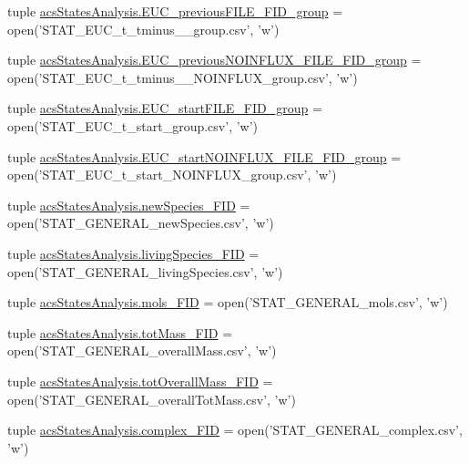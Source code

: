 \begin{DoxyCompactItemize}
tuple \hyperlink{a00132_adf079c2d443f89f00a330a58f99c2095}{acs\+States\+Analysis.\+E\+U\+C\+\_\+previous\+F\+I\+L\+E\+\_\+\+F\+I\+D\+\_\+group} = open('S\+T\+A\+T\+\_\+\+E\+U\+C\+\_\+t\+\_\+tminus\+\_\+\_\+group.\+csv', 'w')
\item 
tuple \hyperlink{a00132_ace5cf628b305f9110e058d7dafd27fb4}{acs\+States\+Analysis.\+E\+U\+C\+\_\+previous\+N\+O\+I\+N\+F\+L\+U\+X\+\_\+\+F\+I\+L\+E\+\_\+\+F\+I\+D\+\_\+group} = open('S\+T\+A\+T\+\_\+\+E\+U\+C\+\_\+t\+\_\+tminus\+\_\+\_\+\+N\+O\+I\+N\+F\+L\+U\+X\+\_\+group.\+csv', 'w')
\item 
tuple \hyperlink{a00132_abe1a2acadc97e46d55c6f4164c0890dc}{acs\+States\+Analysis.\+E\+U\+C\+\_\+start\+F\+I\+L\+E\+\_\+\+F\+I\+D\+\_\+group} = open('S\+T\+A\+T\+\_\+\+E\+U\+C\+\_\+t\+\_\+start\+\_\+group.\+csv', 'w')
\item 
tuple \hyperlink{a00132_aef08a333d5fed02e90483cc87e389ed0}{acs\+States\+Analysis.\+E\+U\+C\+\_\+start\+N\+O\+I\+N\+F\+L\+U\+X\+\_\+\+F\+I\+L\+E\+\_\+\+F\+I\+D\+\_\+group} = open('S\+T\+A\+T\+\_\+\+E\+U\+C\+\_\+t\+\_\+start\+\_\+\+N\+O\+I\+N\+F\+L\+U\+X\+\_\+group.\+csv', 'w')
\item 
tuple \hyperlink{a00132_abdb6e583333cc08cac8c63631db80b5b}{acs\+States\+Analysis.\+new\+Species\+\_\+\+F\+I\+D} = open('S\+T\+A\+T\+\_\+\+G\+E\+N\+E\+R\+A\+L\+\_\+new\+Species.\+csv', 'w')
\item 
tuple \hyperlink{a00132_ab7bbe9440116d34c9a373c40fc59bb3d}{acs\+States\+Analysis.\+living\+Species\+\_\+\+F\+I\+D} = open('S\+T\+A\+T\+\_\+\+G\+E\+N\+E\+R\+A\+L\+\_\+living\+Species.\+csv', 'w')
\item 
tuple \hyperlink{a00132_a603a41889d8732146d44da83ffaf0489}{acs\+States\+Analysis.\+mols\+\_\+\+F\+I\+D} = open('S\+T\+A\+T\+\_\+\+G\+E\+N\+E\+R\+A\+L\+\_\+mols.\+csv', 'w')
\item 
tuple \hyperlink{a00132_a1b7f5672822b59c7284cd2b703aacbc2}{acs\+States\+Analysis.\+tot\+Mass\+\_\+\+F\+I\+D} = open('S\+T\+A\+T\+\_\+\+G\+E\+N\+E\+R\+A\+L\+\_\+overall\+Mass.\+csv', 'w')
\item 
tuple \hyperlink{a00132_a20a06acdb6e82bcaab87d2781d3555a9}{acs\+States\+Analysis.\+tot\+Overall\+Mass\+\_\+\+F\+I\+D} = open('S\+T\+A\+T\+\_\+\+G\+E\+N\+E\+R\+A\+L\+\_\+overall\+Tot\+Mass.\+csv', 'w')
\item 
tuple \hyperlink{a00132_ace41560d233dff88c3073be734bae944}{acs\+States\+Analysis.\+complex\+\_\+\+F\+I\+D} = open('S\+T\+A\+T\+\_\+\+G\+E\+N\+E\+R\+A\+L\+\_\+complex.\+csv', 'w')
\item 

\end{DoxyCompactItemize}
